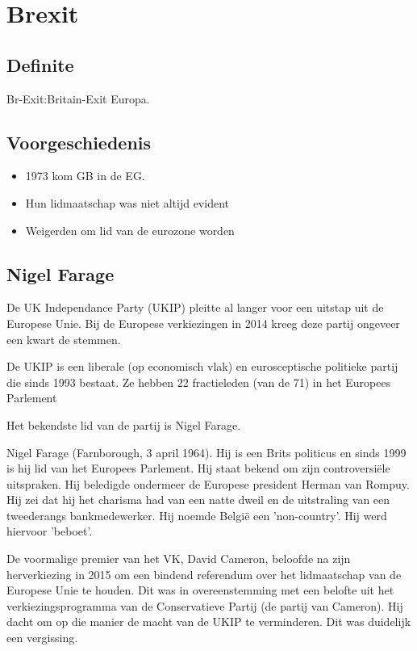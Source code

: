 \documentclass{article}
\begin{document}
\section{Brexit}
\subsection{Definite}
Br-Exit:Britain-Exit Europa.
\subsection{Voorgeschiedenis}
\begin{itemize}
    \item 1973 kom GB in de EG.
    \item  Hun lidmaatschap was niet altijd evident
    \item Weigerden om lid van de eurozone worden
\end{itemize}
\subsection{Nigel Farage}
De UK Independance Party (UKIP) pleitte al langer voor een uitstap uit de Europese
Unie. Bij de Europese verkiezingen in 2014 kreeg deze partij ongeveer een kwart
de stemmen.\\
\par

De UKIP is een liberale (op economisch vlak) en eurosceptische politieke partij die
sinds 1993 bestaat. Ze hebben 22 fractieleden (van de 71) in het Europees Parlement\\
\par
Het bekendste lid van de partij is Nigel Farage.\\
\par
Nigel Farage (Farnborough, 3 april 1964). Hij is een Brits politicus en sinds 1999 is hij
lid van het Europees Parlement. Hij staat bekend om zijn controversiële uitspraken.
Hij beledigde ondermeer de Europese president Herman van Rompuy. Hij zei dat hij
het charisma had van een natte dweil en de uitstraling van een tweederangs
bankmedewerker. Hij noemde België een 'non-country'. Hij werd hiervoor 'beboet'.\\
\par
De voormalige premier van het VK, David Cameron, beloofde na zijn herverkiezing in 2015 om een bindend referendum over het lidmaatschap van de Europese Unie te
houden. Dit was in overeenstemming met een belofte uit het verkiezingsprogramma
van de Conservatieve Partij (de partij van Cameron). Hij dacht om op die manier de macht van de UKIP te verminderen. Dit was duidelijk een vergissing.
\end{document}
